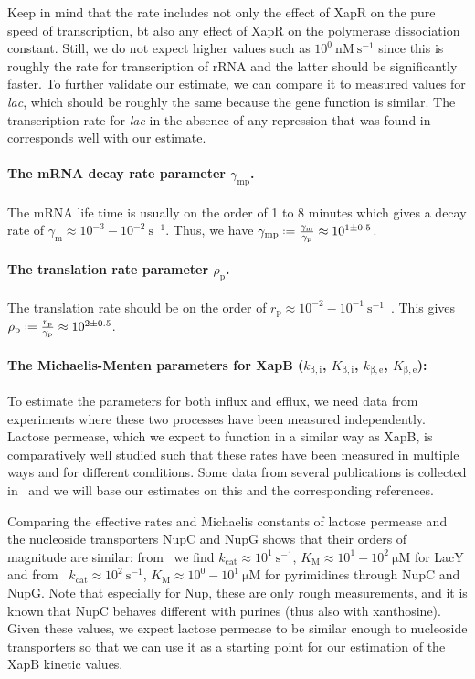 \documentclass[10pt,letterpaper]{article}
\newcommand{\n}[1]{\mathrm{#1}}
\newcommand*{\defeq}{\mathrel{\vcenter{\baselineskip0.5ex \lineskiplimit0pt
			\hbox{\scriptsize.}\hbox{\scriptsize.}}}%
	=}
\begin{document}
Keep in mind that the rate includes not only the effect of XapR on the pure speed of transcription, bt also any effect of XapR on the polymerase dissociation constant. Still, we do not expect higher values such as $10^{0}~\n{nM\ s^{-1}}$ since this is roughly the rate for transcription of rRNA and the latter should be significantly faster. 
To further validate our estimate, we can compare it to measured values for \emph{lac}, which should be roughly the same because the gene function is similar. The transcription rate for \emph{lac} in the absence of any repression that was found in~\cite{RazoMejia2019} corresponds well with our estimate.

\paragraph*{The mRNA decay rate parameter $\gamma_{\n{mp}}$.}
The mRNA life time is usually on the order of 1 to 8 minutes which gives a decay rate of $\gamma_{\n{m}} \approx 10^{-3} - 10^{-2}~\n{s^{-1}}$. Thus, we have $\gamma_{\n{mp}} \defeq \frac{\gamma_{\n{m}}}{\gamma_{\n{p}}} \approx 10^{1 \pm 0.5}$. 

\paragraph*{The translation rate parameter $\rho_{\n{p}}$.}
The translation rate should be on the order of $r_{\n{p}} \approx 10^{-2} - 10^{-1}~\n{s^{-1}}$~\cite{Milo2016}. This gives $\rho_{\n{p}} \defeq \frac{r_{\n{p}}}{\gamma_{\n{p}}} \approx 10^{2 \pm 0.5}$.


\paragraph*{The Michaelis-Menten parameters for XapB ($k_{\n{\beta,i}}$, $K_{\n{\beta,i}}$, $k_{\n{\beta,e}}$, $K_{\n{\beta,e}}$):}
To estimate the parameters for both influx and efflux, we need data from experiments where these two processes have been measured independently. Lactose permease, which we expect to function in a similar way as XapB, is comparatively well studied such that these rates have been measured in multiple ways and for different conditions. Some data from several publications is collected in~\cite{Viitanen1984} and we will base our estimates on this and the corresponding references.

Comparing the effective rates and Michaelis constants of lactose permease and the nucleoside transporters NupC and NupG shows that their orders of magnitude are similar: from~\cite{Dornmair1989,Wright1985} we find $k_{\n{cat}} \approx 10^1~\n{s^{-1}}$, $K_{\n{M}} \approx 10^1-10^2~\n{\mu M}$ for LacY and from~\cite{Norholm2001,Komatsu1973,MunchPetersen1979} $k_{\n{cat}} \approx 10^2~\n{s^{-1}}$, $K_{\n{M}} \approx 10^0-10^1~\n{\mu M}$ for pyrimidines through NupC and NupG. Note that especially for Nup, these are only rough measurements, and it is known that NupC behaves different with purines (thus also with xanthosine). Given these values, we expect lactose permease to be similar enough to nucleoside transporters so that we can use it as a starting point for our estimation of the XapB kinetic values.
\end{document}
